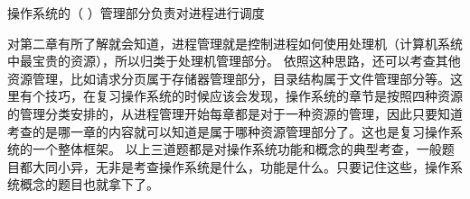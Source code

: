 \question 操作系统的（ ）管理部分负责对进程进行调度
\par{}
\begin{solution}对第二章有所了解就会知道，进程管理就是控制进程如何使用处理机（计算机系统中最宝贵的资源），所以归类于处理机管理部分。
依照这种思路，还可以考查其他资源管理，比如请求分页属于存储器管理部分，目录结构属于文件管理部分等。这里有个技巧，在复习操作系统的时候应该会发现，操作系统的章节是按照四种资源的管理分类安排的，从进程管理开始每章都是对于一种资源的管理，因此只要知道考查的是哪一章的内容就可以知道是属于哪种资源管理部分了。这也是复习操作系统的一个整体框架。
以上三道题都是对操作系统功能和概念的典型考查，一般题目都大同小异，无非是考查操作系统是什么，功能是什么。只要记住这些，操作系统概念的题目也就拿下了。
\end{solution}
